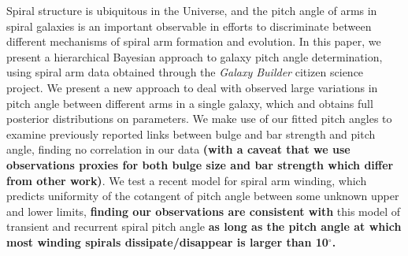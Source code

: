 Spiral structure is ubiquitous in the Universe, and the pitch angle of arms in spiral galaxies is an important observable in efforts to discriminate between different mechanisms of spiral arm formation and evolution. In this paper, we present a hierarchical Bayesian approach to galaxy pitch angle determination, using spiral arm data obtained through the \textit{Galaxy Builder} citizen science project. We present a new approach to deal with observed large variations in pitch angle between different arms in a single galaxy, which and obtains full posterior distributions on parameters. We make use of our fitted pitch angles to examine previously reported links between bulge and bar strength and pitch angle, finding no correlation in our data {\bf (with a caveat that we use observations proxies for both bulge size and bar strength which differ from other work)}. We test a recent model for spiral arm winding, which predicts uniformity of the cotangent of pitch angle between some unknown upper and lower limits, {\bf finding our observations are consistent with} this model of transient and recurrent spiral pitch angle {\bf as long as the pitch angle at which most winding spirals dissipate/disappear is larger than 10$^\circ$.}
